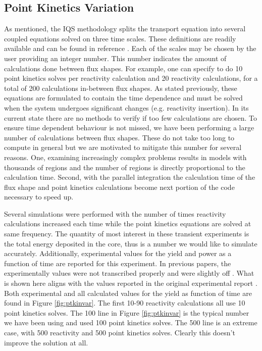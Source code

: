 \documentclass{anstrans}
\begin{document}
\subsection{Point Kinetics Variation}
As mentioned, the IQS methodology  splits the transport equation into several coupled equations solved on three time scales.  These definitions are readily available and can be found in reference \cite{Bentley}.  Each of the scales may be chosen by the user providing an integer number.  This number indicates the amount of calculations done between flux shapes.  For example, one can specify to do 10 point kinetics solves per reactivity calculation and 20 reactivity calculations, for a total of 200 calculations in-between flux shapes.  As stated previously, these equations are formulated to contain the time dependence and must be solved when the system undergoes significant changes (e.g. reactivity insertion).  In its current state there are no methods to verify if too few calculations are chosen. To ensure time dependent behaviour is not missed, we have been performing a large number of calculations between flux shapes.  These do not take too long to compute in general but we are motivated to mitigate this number for several reasons.  One, examining increasingly complex problems results in models with thousands of regions and the number of regions is directly proportional to the calculation time.  Second, with the parallel integration the calculation time of the flux shape and point kinetics calculations become next portion of the code necessary to speed up.

   Several simulations were performed with the number of times reactivity calculations increased each time while the point kinetics equations are solved at same frequency.  The quantity of most interest in these transient experiments is the total energy deposited in the core, thus is a number we would like to simulate accurately.  Additionally, experimental values for the yield and power as a function of time are reported for this experiment.  In previous  papers, the experimentally values were not transcribed properly and were slightly off \cite{physor_mausolff}.  What is shown here aligns with the values reported in the original experimental report \cite{Robinson_Bauer_1994}.  Both experimental and all calculated values for the yield as function of time are found in Figure \ref{fig:ptkinvar}.  The first 10-90 reactivity calculations all use 10 point kinetics solves.  The 100 line in Figure \ref{fig:ptkinvar} is the typical number we have been using and used 100 point kinetics solves.  The 500 line is an extreme case, with 500 reactivity and 500 point kinetics solves. Clearly this doesn't improve the solution at all.
   
\end{document}
